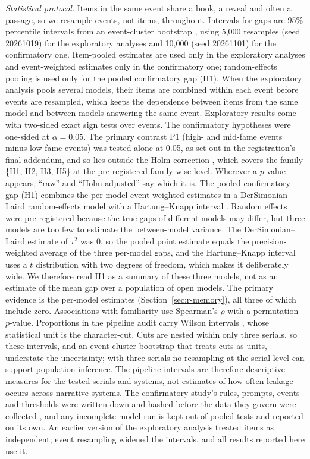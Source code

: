 \documentclass[sn-mathphys]{sn-jnl}%
\theoremstyle{thmstyleone}%
\theoremstyle{thmstyletwo}%
\theoremstyle{thmstylethree}%
\begin{document}
\emph{Statistical protocol.} Items in the same event share a book, a reveal and often a passage, so we resample events, not items, throughout. Intervals for gaps are 95\% percentile intervals from an event-cluster bootstrap \cite{efron1993bootstrap,dror2018hitchhiker}, using 5,000 resamples (seed 20261019) for the exploratory analyses and 10,000 (seed 20261101) for the confirmatory one. Item-pooled estimates are used only in the exploratory analyses and event-weighted estimates only in the confirmatory one; random-effects pooling is used only for the pooled confirmatory gap (H1). When the exploratory analysis pools several models, their items are combined within each event before events are resampled, which keeps the dependence between items from the same model and between models answering the same event. Exploratory results come with two-sided exact sign tests over events. The confirmatory hypotheses were one-sided at $\alpha=0.05$. The primary contrast P1 (high- and mid-fame events minus low-fame events) was tested alone at 0.05, as set out in the registration's final addendum, and so lies outside the Holm correction \cite{holm1979simple}, which covers the family \{H1, H2, H3, H5\} at the pre-registered family-wise level. Wherever a $p$-value appears, ``raw'' and ``Holm-adjusted'' say which it is. The pooled confirmatory gap (H1) combines the per-model event-weighted estimates in a DerSimonian--Laird random-effects model \cite{dersimonian1986meta} with a Hartung--Knapp interval \cite{hartung2001tests}. Random effects were pre-registered because the true gaps of different models may differ, but three models are too few to estimate the between-model variance. The DerSimonian--Laird estimate of $\tau^2$ was 0, so the pooled point estimate equals the precision-weighted average of the three per-model gaps, and the Hartung--Knapp interval uses a $t$ distribution with two degrees of freedom, which makes it deliberately wide. We therefore read H1 as a summary of these three models, not as an estimate of the mean gap over a population of open models. The primary evidence is the per-model estimates (Section~\ref{sec:r-memory}), all three of which include zero. Associations with familiarity use Spearman's $\rho$ with a permutation $p$-value. Proportions in the pipeline audit carry Wilson intervals \cite{wilson1927probable}, whose statistical unit is the character-cut. Cuts are nested within only three serials, so these intervals, and an event-cluster bootstrap that treats cuts as units, understate the uncertainty; with three serials no resampling at the serial level can support population inference. The pipeline intervals are therefore descriptive measures for the tested serials and systems, not estimates of how often leakage occurs across narrative systems. The confirmatory study's rules, prompts, events and thresholds were written down and hashed before the data they govern were collected \cite{nosek2018preregistration}, and any incomplete model run is kept out of pooled tests and reported on its own. An earlier version of the exploratory analysis treated items as independent; event resampling widened the intervals, and all results reported here use it.
\end{document}
